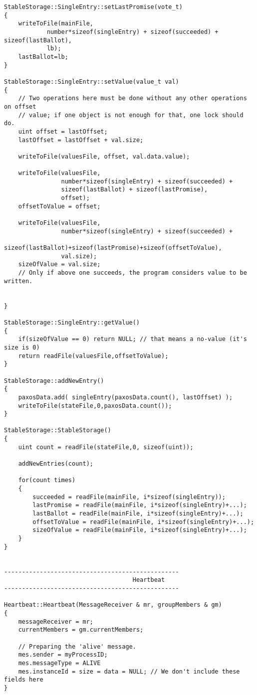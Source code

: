 {\begin{lstlisting}[frame=lines,caption=Pseudocode of Paxos algorithm]
StableStorage::SingleEntry::setLastPromise(vote_t)
{
	writeToFile(mainFile,
			number*sizeof(singleEntry) + sizeof(succeeded) + sizeof(lastBallot),
			lb);
	lastBallot=lb;
}

StableStorage::SingleEntry::setValue(value_t val)
{
	// Two operations here must be done without any other operations on offset
	// value; if one object is not enough for that, one lock should do.
	uint offset = lastOffset;
	lastOffset = lastOffset + val.size;

	writeToFile(valuesFile, offset, val.data.value);

	writeToFile(valuesFile,
				number*sizeof(singleEntry) + sizeof(succeeded) +
				sizeof(lastBallot) + sizeof(lastPromise),
				offset);
	offsetToValue = offset;

	writeToFile(valuesFile,
				number*sizeof(singleEntry) + sizeof(succeeded) +
				sizeof(lastBallot)+sizeof(lastPromise)+sizeof(offsetToValue),
				val.size);
	sizeOfValue = val.size;
	// Only if above one succeeds, the program considers value to be written.


}

StableStorage::SingleEntry::getValue()
{
	if(sizeOfValue == 0) return NULL; // that means a no-value (it's size is 0)
	return readFile(valuesFile,offsetToValue);
}

StableStorage::addNewEntry()
{
	paxosData.add( singleEntry(paxosData.count(), lastOffset) );
	writeToFile(stateFile,0,paxosData.count());
}

StableStorage::StableStorage()
{
	uint count = readFile(stateFile,0, sizeof(uint));

	addNewEntries(count);

	for(count times)
	{
		succeeded = readFile(mainFile, i*sizeof(singleEntry));
		lastPromise = readFile(mainFile, i*sizeof(singleEntry)+...);
		lastBallot = readFile(mainFile, i*sizeof(singleEntry)+...);
		offsetToValue = readFile(mainFile, i*sizeof(singleEntry)+...);
		sizeOfValue = readFile(mainFile, i*sizeof(singleEntry)+...);
	}
}


-------------------------------------------------
                                    Heartbeat
-------------------------------------------------

Heartbeat::Heartbeat(MessageReceiver & mr, groupMembers & gm)
{
	messageReceiver = mr;
	currentMembers = gm.currentMembers;
	
	// Preparing the 'alive' message.
	mes.sender = myProcessID;
	mes.messageType = ALIVE
	mes.instanceId = size = data = NULL; // We don't include these fields here
}


\end{lstlisting}}
